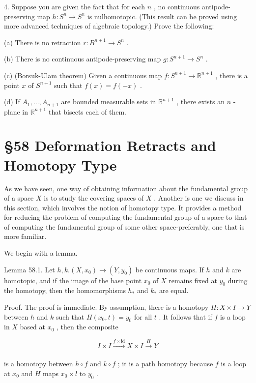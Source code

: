 4. Suppose you are given the fact that for each \(n\) , no continuous antipode-preserving map \(h : {S}^{n} \rightarrow  {S}^{n}\) is nulhomotopic. (This result can be proved using more advanced techniques of algebraic topology.) Prove the following:

(a) There is no retraction \(r : {B}^{n + 1} \rightarrow  {S}^{n}\) .

(b) There is no continuous antipode-preserving map \(g : {S}^{n + 1} \rightarrow  {S}^{n}\) .

(c) (Borsuk-Ulam theorem) Given a continuous map \(f : {S}^{n + 1} \rightarrow  {\mathbb{R}}^{n + 1}\) , there is a point \(x\) of \({S}^{n + 1}\) such that \(f\left( x\right)  = f\left( {-x}\right)\) .

(d) If \({A}_{1},\ldots ,{A}_{n + 1}\) are bounded measurable sets in \({\mathbb{R}}^{n + 1}\) , there exists an \(n\) - plane in \({\mathbb{R}}^{n + 1}\) that bisects each of them.

\section*{§58 Deformation Retracts and Homotopy Type}

As we have seen, one way of obtaining information about the fundamental group of a space \(X\) is to study the covering spaces of \(X\) . Another is one we discuss in this section, which involves the notion of homotopy type. It provides a method for reducing the problem of computing the fundamental group of a space to that of computing the fundamental group of some other space-preferably, one that is more familiar.

We begin with a lemma.

Lemma 58.1. Let \(h,k.\left( {X,{x}_{0}}\right)  \rightarrow  \left( {Y,{y}_{0}}\right)\) be continuous maps. If \(h\) and \(k\) are homotopic, and if the image of the base point \({x}_{0}\) of \(X\) remains fixed at \({y}_{0}\) during the homotopy, then the homomorphisms \({h}_{ * }\) and \({k}_{ * }\) are equal.

Proof. The proof is immediate. By assumption, there is a homotopy \(H : X \times  I \rightarrow  Y\) between \(h\) and \(k\) such that \(H\left( {{x}_{0},t}\right)  = {y}_{0}\) for all \(t\) . It follows that if \(f\) is a loop in \(X\) based at \({x}_{0}\) , then the composite

\[
I \times  I\xrightarrow[]{f \times  \mathrm{{id}}}X \times  I\xrightarrow[]{H}Y
\]

is a homotopy between \(h \circ  f\) and \(k \circ  f\) ; it is a path homotopy because \(f\) is a loop at \({x}_{0}\) and \(H\) maps \({x}_{0} \times  l\) to \({y}_{0}\) .

